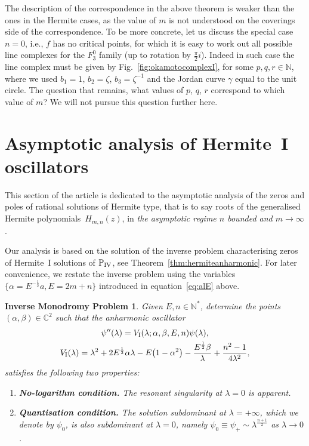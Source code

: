 \documentclass[pdftex]{sigma}
\numberwithin{equation}{section}
\newtheorem*{probinv*}{Inverse Monodromy Problem}
\newcommand{\la}{\lambda}
\newcommand{\al}{\alpha}
\begin{document}
The description of the correspondence in the above theorem is weaker than the ones in the Hermite cases, as the value of $m$ is not understood on the coverings side of the correspondence. To be more concrete, let us discuss the special case $n=0$, i.e., $f$ has no critical points, for which it is easy to work out all possible line complexes for the $F_3^0$ family (up to rotation by $\frac\pi2 i$). Indeed in such case the line complex must be given by Fig.~\ref{fig:okamotocomplexI}, for some $p,q,r\in\mathbb{N}$, where we used $b_1=1$, $b_2=\zeta$, $b_3=\zeta^{-1}$ and the Jordan curve $\gamma$ equal to the unit circle. The question that remains, what values of $p$, $q$, $r$ correspond to which value of $m$? We will not pursue this question further here.

\section{Asymptotic analysis of Hermite~I oscillators}\label{section:asymptotic}
This section of the article is dedicated to the asymptotic analysis of the zeros and poles of rational solutions of Hermite type, that is to say roots of the generalised Hermite polyno\-mials~$H_{m,n}(z)$, in \textit{the asymptotic regime $n$ bounded and $m \to \infty$}.

Our analysis is based on the solution of the inverse problem characterising zeros of Hermite~I solutions of ${\rm P}_{\rm IV}$, see Theorem~\ref{thm:hermiteanharmonic}.
For later convenience, we restate the inverse problem using the variables $\{\al=E^{-\frac12}a,E=2m+n\}$ introduced in equation~\eqref{eq:alE} above.
\begin{probinv*} Given $E,n\in\mathbb{N}^*$, determine the points $(\alpha,\beta)\in\mathbb{C}^2$ such that the anharmonic oscillator
	\begin{gather}\nonumber
	\psi''(\lambda)=V_{{\rm I}}(\lambda;\al,\beta,E,n)\psi(\lambda), \\ \label{eq:hIK}
	 V_{\rm I}(\la)= \lambda^2+2E^{\frac12}\al\lambda-E\big(1-\al^2\big)-\frac{E^{\frac12 }\beta}{\lambda}+\frac{n^2-1}{4 \la^2},
	\end{gather}
	satisfies the following two properties:
	\begin{enumerate}\itemsep=0pt
		\item[$1.$] \textbf{No-logarithm condition.} The resonant singularity at $\la=0$ is apparent.
		\item[$2.$] \textbf{Quantisation condition.} The solution subdominant at $\la=+\infty$, which we denote by $\psi_0$, is also subdominant at $\la=0$,
		namely $\psi_0 \equiv \psi_+ \sim \la^{\frac{n+1}{2}}$ as $\la \to 0$.
	\end{enumerate}
\end{probinv*}
\end{document}
